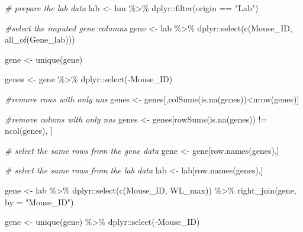 \documentclass[
]{article}
\newenvironment{Shaded}{\begin{snugshade}}{\end{snugshade}}
\newcommand{\AttributeTok}[1]{\textcolor[rgb]{0.77,0.63,0.00}{#1}}
\newcommand{\CommentTok}[1]{\textcolor[rgb]{0.56,0.35,0.01}{\textit{#1}}}
\newcommand{\FunctionTok}[1]{\textcolor[rgb]{0.00,0.00,0.00}{#1}}
\newcommand{\NormalTok}[1]{#1}
\newcommand{\OtherTok}[1]{\textcolor[rgb]{0.56,0.35,0.01}{#1}}
\newcommand{\SpecialCharTok}[1]{\textcolor[rgb]{0.00,0.00,0.00}{#1}}
\newcommand{\StringTok}[1]{\textcolor[rgb]{0.31,0.60,0.02}{#1}}
\begin{document}
\begin{Shaded}
\begin{Highlighting}[]
\CommentTok{\# prepare the lab data}
\NormalTok{lab }\OtherTok{\textless{}{-}}\NormalTok{ hm }\SpecialCharTok{\%\textgreater{}\%} 
\NormalTok{  dplyr}\SpecialCharTok{::}\FunctionTok{filter}\NormalTok{(origin }\SpecialCharTok{==} \StringTok{"Lab"}\NormalTok{)}


\CommentTok{\#select the imputed gene columns}
\NormalTok{gene }\OtherTok{\textless{}{-}}\NormalTok{  lab }\SpecialCharTok{\%\textgreater{}\%}
\NormalTok{  dplyr}\SpecialCharTok{::}\FunctionTok{select}\NormalTok{(}\FunctionTok{c}\NormalTok{(Mouse\_ID, }\FunctionTok{all\_of}\NormalTok{(Gene\_lab)))}

\NormalTok{gene }\OtherTok{\textless{}{-}} \FunctionTok{unique}\NormalTok{(gene)}

\NormalTok{genes }\OtherTok{\textless{}{-}}\NormalTok{ gene }\SpecialCharTok{\%\textgreater{}\%}
\NormalTok{  dplyr}\SpecialCharTok{::}\FunctionTok{select}\NormalTok{(}\SpecialCharTok{{-}}\NormalTok{Mouse\_ID)}

\CommentTok{\#remove rows with only nas}
\NormalTok{genes }\OtherTok{\textless{}{-}}\NormalTok{ genes[,}\FunctionTok{colSums}\NormalTok{(}\FunctionTok{is.na}\NormalTok{(genes))}\SpecialCharTok{\textless{}}\FunctionTok{nrow}\NormalTok{(genes)]}

\CommentTok{\#remove colums with only nas }
\NormalTok{genes }\OtherTok{\textless{}{-}}\NormalTok{ genes[}\FunctionTok{rowSums}\NormalTok{(}\FunctionTok{is.na}\NormalTok{(genes)) }\SpecialCharTok{!=} \FunctionTok{ncol}\NormalTok{(genes), ]}

\CommentTok{\# select the same rows from the gene data}
\NormalTok{gene }\OtherTok{\textless{}{-}}\NormalTok{ gene[}\FunctionTok{row.names}\NormalTok{(genes),]}

\CommentTok{\# select the same rows from the lab data}
\NormalTok{lab }\OtherTok{\textless{}{-}}\NormalTok{ lab[}\FunctionTok{row.names}\NormalTok{(genes),]}


\NormalTok{gene }\OtherTok{\textless{}{-}}\NormalTok{ lab }\SpecialCharTok{\%\textgreater{}\%}
\NormalTok{  dplyr}\SpecialCharTok{::}\FunctionTok{select}\NormalTok{(}\FunctionTok{c}\NormalTok{(Mouse\_ID, WL\_max)) }\SpecialCharTok{\%\textgreater{}\%}
  \FunctionTok{right\_join}\NormalTok{(gene, }\AttributeTok{by =} \StringTok{"Mouse\_ID"}\NormalTok{)}

\NormalTok{gene }\OtherTok{\textless{}{-}} \FunctionTok{unique}\NormalTok{(gene) }\SpecialCharTok{\%\textgreater{}\%}
\NormalTok{  dplyr}\SpecialCharTok{::}\FunctionTok{select}\NormalTok{(}\SpecialCharTok{{-}}\NormalTok{Mouse\_ID)}
\end{Highlighting}
\end{Shaded}
\end{document}
